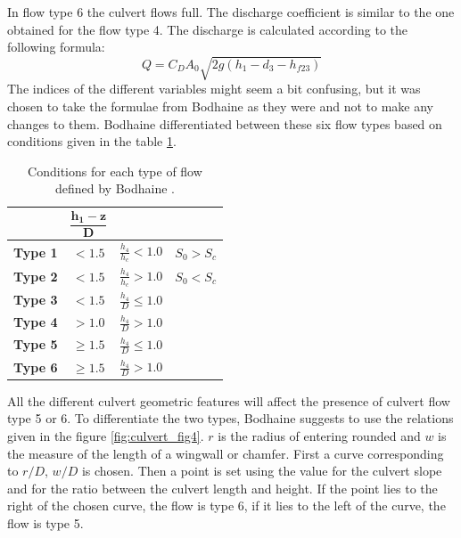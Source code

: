 In flow type 6 the culvert flows full. The discharge coefficient is similar to the
one obtained for the flow type 4.
The discharge is calculated according to the following formula:
\begin{equation}
Q=C_D A_0 \sqrt{2g(h_1-d_3-h_{f23})}
\end{equation}
The indices of the different variables might seem a bit confusing,
but it was chosen to take the formulae from Bodhaine as they were
and not to make any changes to them.
Bodhaine differentiated between these six flow types based on conditions
given in the table \ref{tab:culvert_tab1}.

\begin{table}[H]
\caption{Conditions for each type of flow defined by Bodhaine \cite{Bodhaine1968}.}\label{tab:culvert_tab1}
\begin{center}\begin{tabular}{|c|c|c|c|}
\hline
~ & $\mathbf{\dfrac{h_1-z}{D}}$ & ~ & ~\\
\hline
\textbf{Type 1} & $<1.5$    &  $\frac{h_4}{h_c} < 1.0$ & $S_0 > S_c$\\
\hline
\textbf{Type 2} & $<1.5$    &  $\frac{h_4}{h_c} > 1.0$ & $S_0 < S_c$\\
\hline
\textbf{Type 3} & $<1.5$    & $\frac{h_4}{D} \le 1.0$ & ~\\
\hline
\textbf{Type 4} & $> 1.0$   & $\frac{h_4}{D} > 1.0$ & ~\\
\hline
\textbf{Type 5} & $\ge 1.5$ & $\frac{h_4}{D} \le 1.0$ & ~\\
\hline
\textbf{Type 6} & $\ge 1.5$ & $\frac{h_4}{D} > 1.0$  & ~\\
\hline
\end{tabular}\end{center}
\end{table}

All the different culvert geometric features will affect the presence of culvert flow type 5 or 6.
To differentiate the two types, Bodhaine \cite{Bodhaine1968} suggests to use the relations given in the figure \ref{fig:culvert_fig4}.
$r$ is the radius of entering rounded and $w$ is the measure of the length of a wingwall
or chamfer. First a curve corresponding to $r/D$, $w/D$ is chosen.
Then a point is set using the value for the culvert slope and for the ratio
between the culvert length and height.
If the point lies to the right of the chosen curve, the flow is type 6,
if it lies to the left of the curve, the flow is type 5.

